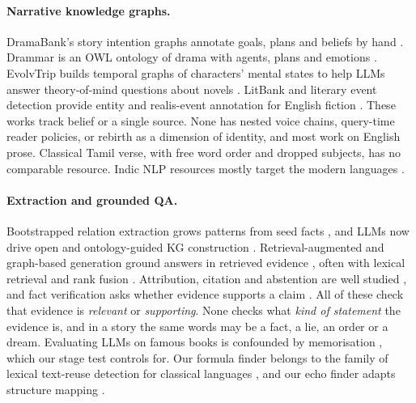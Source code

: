 \documentclass[11pt]{article}
\begin{document}
\paragraph{Narrative knowledge graphs.} DramaBank's story intention graphs annotate goals, plans and beliefs by hand \citep{Elson2012DramabankAnnotating}. Drammar is an OWL ontology of drama with agents, plans and emotions \citep{Lombardo2018Drammar}. EvolvTrip builds temporal graphs of characters' mental states to help LLMs answer theory-of-mind questions about novels \citep{Yang2025EvolvtripEnhancing}. LitBank and literary event detection provide entity and realis-event annotation for English fiction \citep{Bamman2019AnnotatedDataset,Sims2019LiteraryEvent}. These works track belief or a single source. None has nested voice chains, query-time reader policies, or rebirth as a dimension of identity, and most work on English prose. Classical Tamil verse, with free word order and dropped subjects, has no comparable resource. Indic NLP resources mostly target the modern languages \citep{Kakwani2020IndicnlpsuiteMonolingual}.

\paragraph{Extraction and grounded QA.} Bootstrapped relation extraction grows patterns from seed facts \citep{Agichtein2000SnowballExtracting,Batista2015SemisupervisedBootstrapping}, and LLMs now drive open and ontology-guided KG construction \citep{Xu2024LargeLanguage,Mihindukulasooriya2023Text2kgbenchBenchmark}. Retrieval-augmented and graph-based generation ground answers in retrieved evidence \citep{Lewis2020RetrievalaugmentedGeneration,Edge2024FromLocal}, often with lexical retrieval \citep{Robertson2009Bm25} and rank fusion \citep{Cormack2009ReciprocalRank}. Attribution, citation and abstention are well studied \citep{Bohnet2022AttributedQuestion,Gao2023EnablingLarge,Asai2024SelfragLearning,Rajpurkar2018KnowWhat}, and fact verification asks whether evidence supports a claim \citep{Thorne2018FeverLargescale}. All of these check that evidence is \emph{relevant} or \emph{supporting}. None checks what \emph{kind of statement} the evidence is, and in a story the same words may be a fact, a lie, an order or a dream. Evaluating LLMs on famous books is confounded by memorisation \citep{Chang2023SpeakMemory,Carlini2023QuantifyingMemorization}, which our stage test controls for. Our formula finder belongs to the family of lexical text-reuse detection for classical languages \citep{Forstall2014ModelingScholars}, and our echo finder adapts structure mapping \citep{Falkenhainer1989Sme}.
\end{document}
